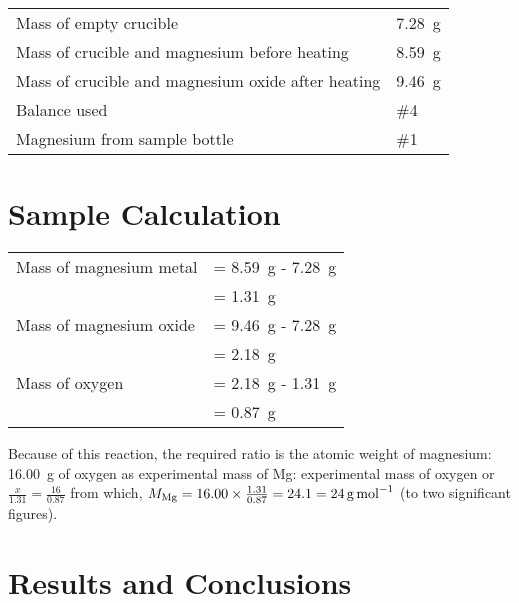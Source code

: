 \documentclass[
	letterpaper, %
	11pt, %
]{CSUniSchoolLabReport}
\begin{document}
\begin{tabular}{l l}
	Mass of empty crucible & \SI{7.28}{\gram}\\ %
	Mass of crucible and magnesium before heating & \SI{8.59}{\gram}\\
	Mass of crucible and magnesium oxide after heating & \SI{9.46}{\gram}\\
	Balance used & \#4\\
	Magnesium from sample bottle & \#1
\end{tabular}


\section{Sample Calculation}

\begin{tabular}{ll}
	Mass of magnesium metal & = \SI{8.59}{\gram} - \SI{7.28}{\gram}\\
	& = \SI{1.31}{\gram}\\
	Mass of magnesium oxide & = \SI{9.46}{\gram} - \SI{7.28}{\gram}\\
	& = \SI{2.18}{\gram}\\
	Mass of oxygen & = \SI{2.18}{\gram} - \SI{1.31}{\gram}\\
	& = \SI{0.87}{\gram}
\end{tabular}

Because of this reaction, the required ratio is the atomic weight of magnesium: \SI{16.00}{\gram} of oxygen as experimental mass of Mg: experimental mass of oxygen or $\frac{x}{1.31} = \frac{16}{0.87}$ from which, $M_{\ce{Mg}} = 16.00 \times \frac{1.31}{0.87} = 24.1 = \SI{24}{\gram\per\mole}$ (to two significant figures).


\section{Results and Conclusions}
\end{document}
